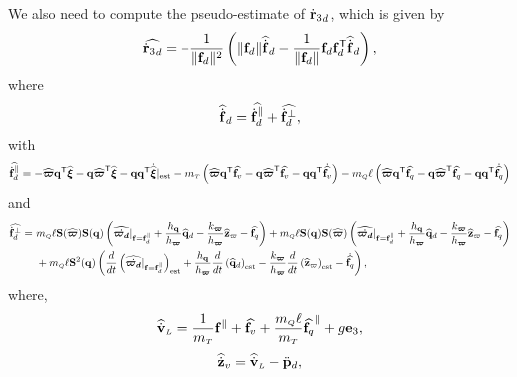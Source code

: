 \documentclass[journal,onecolumn]{IEEEtran}
\newcommand{\minus}{\scalebox{0.75}[1.0]{$-$}}
\begin{document}
	We also need to compute the pseudo-estimate of $\rzddot$, which is given by
	\begin{equation}
		\rzddothat = \minus\frac{1}{\|\fd\|^2}\LP\|\fd\|\fddothat - \frac{1}{\|\fd\|}\fd\fd[T]\fddothat\RP,
		\label{eq:rzddothat}
	\end{equation}
	where
	\begin{equation}
		\fddothat = \widehat{\fddot^{\|}}+\widehat{\fddot^{\perp}},
	\end{equation}
	with
	\begin{equation}
		\widehat{\fddot^{\|}} = -\widehat{\bs{\varpi}}\dir[T]\widehat{\Xiq}-\dir\widehat{\bs{\varpi}}\trs\widehat{\Xiq}-\dir\dir[T]\dot{\widehat{\Xiq}}|_{\text{est}}
		-\mT\LP \widehat{\bs{\varpi}}\dir[T]\widehat{\f_v}-\dir\widehat{\bs{\varpi}}\trs\widehat{\f_v}-\dir\dir[T]\dot{\widehat{\f_v}}\RP
		-\mQ\ell\LP \widehat{\bs{\varpi}}\dir[T]\widehat{\f_q}-\dir\widehat{\bs{\varpi}}\trs\widehat{\f_q}-\dir\dir[T]\dot{\widehat{\f_q}}\RP
	\end{equation}
	and
	\begin{equation}
		\begin{aligned}
		\widehat{\fddot^{\perp}} =~& \mQ\ell\Skew{\widehat{\bs{\varpi}}}\Skew{\dir}\LP\widehat{\dot{\bs{\varpi_d}}}|_{\f=\fd^{\|}} + \frac{h_{\dir}}{h_{\bs{\varpi}}}\qdhat -\frac{k_{\bs{\varpi}}}{h_{\bs{\varpi}}}\zchat- \widehat{\f_q}\RP+\mQ\ell\Skew{\dir}\Skew{\widehat{\bs{\varpi}}}\LP\widehat{\dot{\bs{\varpi_d}}}|_{\f=\fd^{\|}} + \frac{h_{\dir}}{h_{\bs{\varpi}}}\qdhat -\frac{k_{\bs{\varpi}}}{h_{\bs{\varpi}}}\zchat- \widehat{\f_q}\RP\nonumber\\
		&+\mQ\ell\Skew[2]{\dir}\LP\frac{d}{dt}\LP\widehat{\dot{\bs{\varpi_d}}}|_{\f=\fd^{\|}}\RP_{\text{est}} +  \frac{h_{\dir}}{h_{\bs{\varpi}}}\frac{d}{dt}\LP\qdhat\RP_{\text{est}} -\frac{k_{\bs{\varpi}}}{h_{\bs{\varpi}}}\frac{d}{dt}\LP\zchat\RP_{\text{est}}- \dot{\widehat{\f_q}}\RP,
		\end{aligned}
	\end{equation}
	where,
	\begin{equation}
		\vLdothat = \frac{1}{\mT}\f^{\|} + \widehat{\f_v} + \frac{\mQ\ellp}{\mT}\widehat{\f_q}^{\|}+g\ez,
	\end{equation}
	\begin{equation}
		\zvdothat = \vLdothat - \pLdddot,
	\end{equation}
\end{document}
